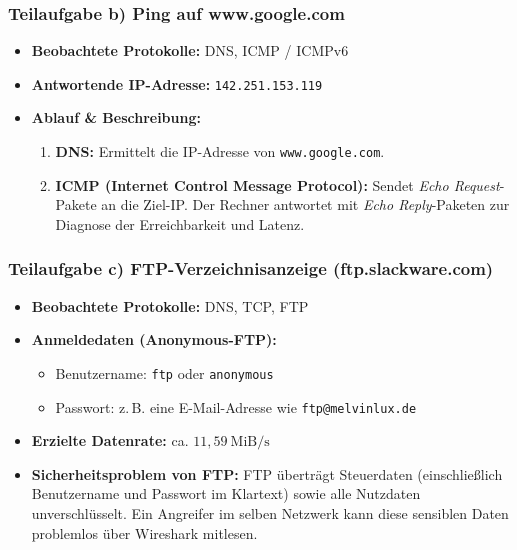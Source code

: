 \documentclass[12pt,a4paper,oneside]{article}
\begin{document}
        \subsubsection*{Teilaufgabe b) Ping auf www.google.com}
            \begin{itemize}
                \item \textbf{Beobachtete Protokolle:} DNS, ICMP / ICMPv6
                \item \textbf{Antwortende IP-Adresse:} \texttt{142.251.153.119}
                \item \textbf{Ablauf \& Beschreibung:}
                \begin{enumerate}
                    \item \textbf{DNS:} Ermittelt die IP-Adresse von \texttt{www.google.com}.
                    \item \textbf{ICMP (Internet Control Message Protocol):} Sendet \textit{Echo Request}-Pakete an die Ziel-IP. Der Rechner antwortet mit \textit{Echo Reply}-Paketen zur Diagnose der Erreichbarkeit und Latenz.
                \end{enumerate}
            \end{itemize}

        \subsubsection*{Teilaufgabe c) FTP-Verzeichnisanzeige (ftp.slackware.com)}
            \begin{itemize}
                \item \textbf{Beobachtete Protokolle:} DNS, TCP, FTP
                \item \textbf{Anmeldedaten (Anonymous-FTP):}
                \begin{itemize}
                    \item Benutzername: \texttt{ftp} oder \texttt{anonymous}
                    \item Passwort: z.\,B. eine E-Mail-Adresse wie \texttt{ftp@melvinlux.de}
                \end{itemize}
                \item \textbf{Erzielte Datenrate:} ca. $11{,}59~\text{MiB/s}$
                \item \textbf{Sicherheitsproblem von FTP:} FTP überträgt Steuerdaten (einschließlich Benutzername und Passwort im Klartext) sowie alle Nutzdaten unverschlüsselt. Ein Angreifer im selben Netzwerk kann diese sensiblen Daten problemlos über Wireshark mitlesen.
            \end{itemize}
\end{document}
